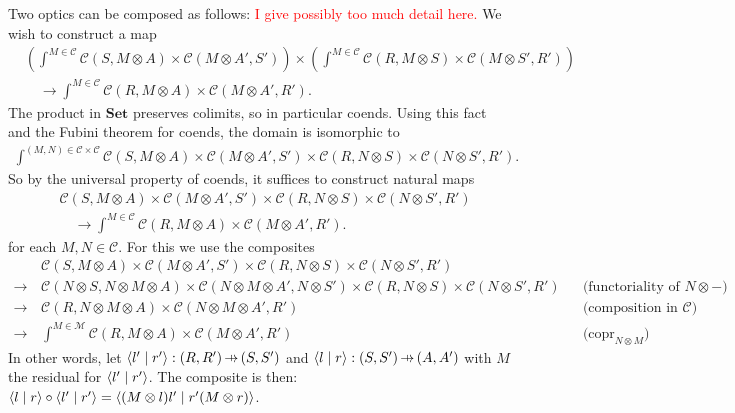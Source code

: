 \documentclass[11pt,letterpaper]{article}
\theoremstyle{plain}
\theoremstyle{definition}
\newcommand{\C}{\mathscr{C}}
\newcommand{\M}{\mathscr{M}}
\newcommand{\Set}{\mathbf{Set}}
\DeclareMathOperator{\copr}{copr}
\newcommand{\rep}[2]{{\ensuremath \left\langle #1 \mid #2 \right\rangle}}
\newcommand{\hto}{\ensuremath{\,\mathaccent\shortmid\rightarrow\,}}
\newcommand{\todo}[1]{\textcolor{red}{\small #1}}
\begin{document}
Two optics can be composed as follows: \todo{I give possibly too much detail here.} We wish to construct a map
\begin{align*}
  &\left(\int^{M \in \C} \C(S, M \otimes A) \times \C(M \otimes A', S')\right) \times \left(\int^{M \in \C} \C(R, M \otimes S) \times \C(M \otimes S', R')\right) \\ &
                                                                                                                                                                       \quad \to \int^{M \in \C} \C(R, M \otimes A) \times \C(M \otimes A', R').
\end{align*}
The product in $\Set$ preserves colimits, so in particular coends. Using this fact and the Fubini theorem for coends, the domain is isomorphic to
\begin{align*}
  \int^{(M, N) \in \C \times \C} \C(S, M \otimes A) \times \C(M \otimes A', S') \times \C(R, N \otimes S) \times \C(N \otimes S', R').
\end{align*}
So by the universal property of coends, it suffices to construct natural maps
\begin{align*}
  & \C(S, M \otimes A) \times \C(M \otimes A', S') \times \C(R, N \otimes S) \times \C(N \otimes S', R') \\ &
                                                                                                              \quad \to \int^{M \in \C} \C(R, M \otimes A) \times \C(M \otimes A', R').
\end{align*}
for each $M, N \in \C$. For this we use the composites
\begin{align*}
  &\C(S, M \otimes A) \times \C(M \otimes A', S') \times \C(R, N \otimes S) \times \C(N \otimes S', R')\\
  \to \,& \C(N \otimes S, N \otimes M \otimes A) \times \C(N \otimes M \otimes A', N \otimes S') \times \C(R, N \otimes S) \times \C(N \otimes S', R') && \text{(functoriality of $N \otimes  -$)} \\
  \to \,& \C(R, N \otimes  M \otimes A) \times \C(N \otimes M \otimes A', R') && \text{(composition in $\C$)} \\
  \to \,&\int^{M \in \M} \C(R, M \otimes A) \times \C(M \otimes A', R') && \text{($\copr_{N \otimes M}$)}
\end{align*}
In other words, let $\rep{l'}{r'} : (R, R') \hto (S, S')$ and $\rep{l}{r} : (S, S') \hto (A, A')$ with $M$ the residual for $\rep{l'}{r'}$. The composite is then: $\rep{l}{r} \circ \rep{l'}{r'} = \rep{(M \otimes l)l'}{r'(M \otimes r)}$.
\end{document}

